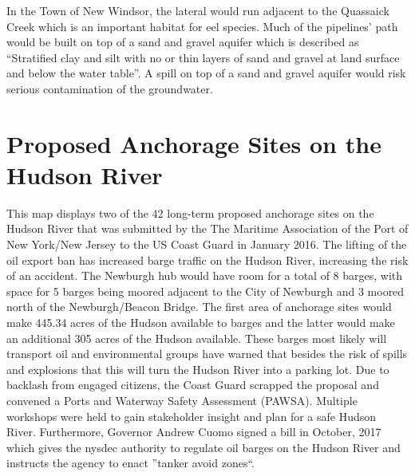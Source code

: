 In the Town of New Windsor, the lateral would run adjacent to the Quassaick 
Creek which is an important habitat for eel species. Much of the pipelines’ 
path would be built on top of a sand and gravel aquifer which is described as 
“Stratified clay and silt with no or thin layers of sand and gravel at land 
surface and below the water table”. A spill on top of a sand and gravel aquifer 
would risk serious contamination of the groundwater.


\label{map:proposedoilpipelines}

\section{Proposed Anchorage Sites on the Hudson 
River}\label{subsec:anchorages}
This map displays two of the 42 long-term proposed anchorage sites on the 
Hudson River that was submitted by the The Maritime Association of the Port of 
New York/New Jersey to the US Coast Guard in January 2016. The lifting of the 
oil export ban has increased barge traffic on the Hudson River, increasing the 
risk of an accident. The Newburgh hub would have room for a total of 8 barges, 
with space for 5 barges being moored adjacent to the City of Newburgh and 3 
moored north of the Newburgh/Beacon Bridge. The first area of anchorage sites 
would make 445.34 acres of the Hudson available to barges and the latter would 
make an additional 305 acres of the Hudson available. These barges most likely 
will transport oil and environmental groups have warned that besides the risk 
of spills and explosions that this will turn the Hudson River into a parking 
lot. Due to backlash from engaged citizens, the Coast Guard scrapped the 
proposal and convened a Ports and Waterway Safety Assessment (PAWSA). Multiple 
workshops were held to gain stakeholder insight and plan for a safe Hudson 
River. Furthermore, Governor Andrew Cuomo signed a bill in October, 2017 which 
gives the \gls{nysdec} authority to regulate oil barges on the Hudson River and 
instructs the agency to enact ''tanker avoid zones``.

\label{
map:proposedanchorages}
